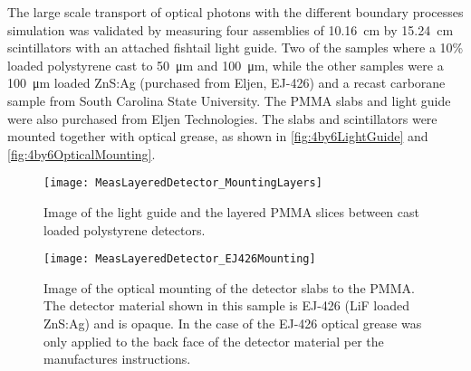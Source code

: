 The large scale transport of optical photons with the different boundary processes simulation was validated by measuring four assemblies of \SI{10.16}{\cm} by \SI{15.24}{\cm} scintillators with an attached fishtail light guide.
Two of the samples where a 10\% loaded  polystyrene cast to \SI{50}{\um} and \SI{100}{\um}, while the other samples were a \SI{100}{\um}  loaded ZnS:Ag (purchased from Eljen, EJ-426) and a recast carborane sample from South Carolina State University.
The PMMA slabs and light guide were also purchased from Eljen Technologies.
The slabs and scintillators were mounted together with optical grease, as shown in \autoref{fig:4by6LightGuide} and \autoref{fig:4by6OpticalMounting}.
\begin{figure}
	\centering
	\texttt{[image: MeasLayeredDetector\_MountingLayers]}
	\caption[4" by 6" Layered Detector Light Guide and Detector Assembly]{Image of the light guide and the layered PMMA slices between cast  loaded polystyrene detectors.}
	\label{fig:4by6LightGuide}
\end{figure}
\begin{figure}
	\centering
	\texttt{[image: MeasLayeredDetector\_EJ426Mounting]}
	\caption[4" by 6" Layered Detector Optical Mounting]{Image of the optical mounting of the detector slabs to the PMMA. The detector material shown in this sample is EJ-426 (LiF loaded ZnS:Ag) and is opaque.  In the case of the EJ-426 optical grease was only applied to the back face of the detector material per the manufactures instructions.}
	\label{fig:4by6OpticalMounting}
\end{figure}

